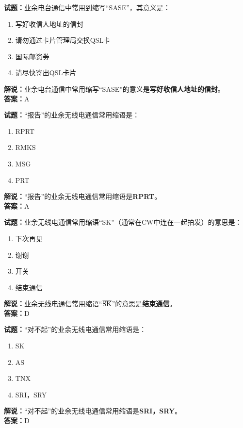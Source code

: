 \documentclass{ctexbook}
\begin{document}
\vspace{1em}

\textbf{试题：}业余电台通信中常用到缩写“SASE”，其意义是：
\begin{enumerate}[leftmargin=3em]
  \item 写好收信人地址的信封
  \item 请勿通过卡片管理局交换QSL卡
  \item 国际邮资券
  \item 请尽快寄出QSL卡片
\end{enumerate}
\noindent\textbf{解说：}业余电台通信中常用缩写“SASE”的意义是\textbf{写好收信人地址的信封}。\\\noindent\textbf{答案：}A

\vspace{1em}

\textbf{试题：}“报告”的业余无线电通信常用缩语是：
\begin{enumerate}[leftmargin=3em]
  \item RPRT
  \item RMKS
  \item MSG
  \item PRT
\end{enumerate}
\noindent\textbf{解说：}“报告”的业余无线电通信常用缩语是\textbf{RPRT}。\\\noindent\textbf{答案：}A

\vspace{1em}

\textbf{试题：}业余无线电通信常用缩语“SK”（通常在CW中连在一起拍发）的意思是：
\begin{enumerate}[leftmargin=3em]
  \item 下次再见
  \item 谢谢
  \item 开关
  \item 结束通信
\end{enumerate}
\noindent\textbf{解说：}业余无线电通信常用缩语“$\overline{\rm SK}$”的意思是\textbf{结束通信}。\\\noindent\textbf{答案：}D

\vspace{1em}

\textbf{试题：}“对不起”的业余无线电通信常用缩语是：
\begin{enumerate}[leftmargin=3em]
  \item SK
  \item AS
  \item TNX
  \item SRI，SRY
\end{enumerate}
\noindent\textbf{解说：}“对不起”的业余无线电通信常用缩语是\textbf{SRI，SRY}。\\\noindent\textbf{答案：}D
\end{document}
